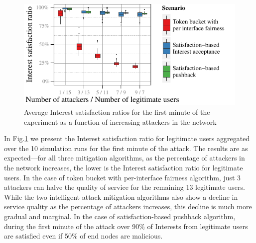 \documentclass[10pt,conference]{IEEEtran}
\renewcommand{\texttt}[1]{{\nicettfont #1}}
\begin{document}
{%

\begin{figure}[t]
  \centering
  \includegraphics[scale=0.8]{paper-topo-tree/tree-good-0-producer-gw-avg-1-min}
  \caption{Average Interest satisfaction ratios for the first minute of the experiment as a function of increasing attackers in the network}
  \label{fig:small-scale-topo boxplot}
\end{figure}

In Fig.\ref{fig:small-scale-topo boxplot} we present  the Interest satisfaction ratio for legitimate users aggregated over the 10 simulation runs for the first minute of the attack. The results are as expected---for all three mitigation algorithms, as the percentage of attackers in the network increases, the lower is the Interest satisfaction ratio for legitimate users.
In the case of token bucket with per-interface fairness algorithm, just 3 attackers can halve the quality of service for the remaining 13 legitimate users. While the two intelligent attack mitigation algorithms also show a decline in service quality as the percentage of attackers increases, this decline is much more gradual and marginal. In the case of satisfaction-based pushback algorithm, during the first minute of the attack over 90\% of Interests from legitimate users are satisfied even if 50\% of end nodes are malicious.  
 



}
\end{document}

